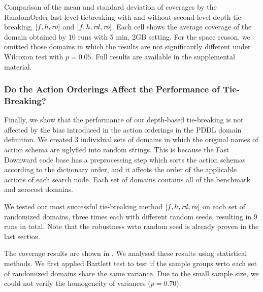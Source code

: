 \begin{table}[tb]
 \centering {}
 
 \caption{Comparison of the mean and standard deviation of coverages by
 the RandomOrder last-level tiebreaking with and
 without second-level depth tie-breaking, $[f,h,\mbox{\textit{ro}}]$ and $[f,h,\mbox{\textit{rd}},\mbox{\textit{ro}}]$. Each cell
 shows the average coverage of the domain obtained by 10 runs with 5
 min, 2GB setting.  For the space reason, we omitted those domains in
 which the results are not significantly different under Wilcoxon test
 with $p=0.05$. Full results are available in the supplemental material.
 }  \label{r-vs-rd-random}
\end{table}

\subsubsection{Do the Action Orderings Affect the Performance of Tie-Breaking?}

Finally, we show that the performance of our depth-based tie-breaking is
not affected by the bias introduced in the action orderings in the PDDL
domain definition.  We created 3 individual sets of domains in which the
original names of action schema are uglyfied into random strings. This is because
the Fast Downward code base has a preprocessing
step which sorts the action schemas according to the dictionary
order, and it affects the order of the applicable actions of each search node.
Each set of domains contains all of the benchmark and zerocost
domains.

We tested our most successful tie-breaking method $[f,h,\mbox{\textit{rd}},\mbox{\textit{ro}}]$ on each
set of randomized domains, three times each with different random seeds,
resulting in 9 runs in total. Note that the robustness wrto random seed is
already proven in the last section.

The coverage results are shown in .
We analysed these results using statistical methods.
We first applied Bartlett test to test if the sample groups wrto each
set of randomized domains share the same variance.
Due to the small sample size, 
we could not verify the homogeneity of variances ($p=0.70$).


